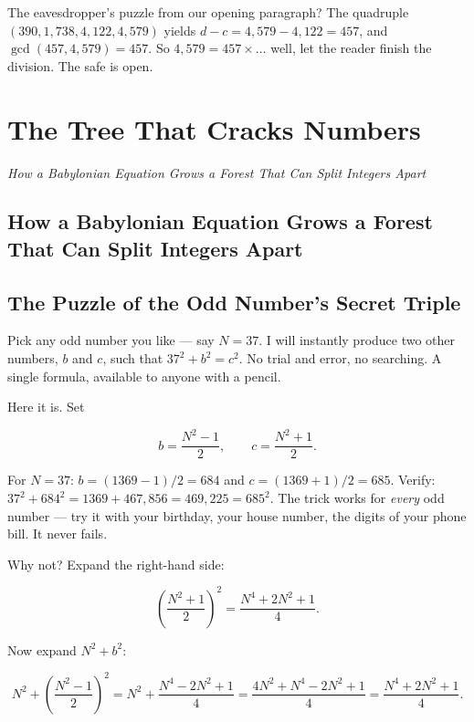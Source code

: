 \documentclass[11pt,openright,twoside]{book}
\theoremstyle{definition}
\begin{document}
The eavesdropper's puzzle from our opening paragraph? The quadruple $(390, 1{,}738, 4{,}122, 4{,}579)$ yields $d - c = 4{,}579 - 4{,}122 = 457$, and $\gcd(457, 4{,}579) = 457$. So $4{,}579 = 457 \times \ldots$ well, let the reader finish the division. The safe is open.

\clearpage


\chapter{The Tree That Cracks Numbers}
\label{ch:14}

\begin{center}
\textit{How a Babylonian Equation Grows a Forest That Can Split Integers Apart}
\end{center}
\bigskip

\section{How a Babylonian Equation Grows a Forest That Can Split Integers Apart}


\bigskip


\section{The Puzzle of the Odd Number's Secret Triple}

Pick any odd number you like --- say $N = 37$. I will instantly produce two other numbers, $b$ and $c$, such that $37^2 + b^2 = c^2$. No trial and error, no searching. A single formula, available to anyone with a pencil.

Here it is. Set

\[b = \frac{N^2 - 1}{2}, \qquad c = \frac{N^2 + 1}{2}.\]

For $N = 37$: $b = (1369 - 1)/2 = 684$ and $c = (1369 + 1)/2 = 685$. Verify: $37^2 + 684^2 = 1369 + 467{,}856 = 469{,}225 = 685^2$. The trick works for \textit{every} odd number --- try it with your birthday, your house number, the digits of your phone bill. It never fails.

Why not? Expand the right-hand side:

\[\left(\frac{N^2 + 1}{2}\right)^{\!2} = \frac{N^4 + 2N^2 + 1}{4}.\]

Now expand $N^2 + b^2$:

\[N^2 + \left(\frac{N^2 - 1}{2}\right)^{\!2} = N^2 + \frac{N^4 - 2N^2 + 1}{4} = \frac{4N^2 + N^4 - 2N^2 + 1}{4} = \frac{N^4 + 2N^2 + 1}{4}.\]
\end{document}
